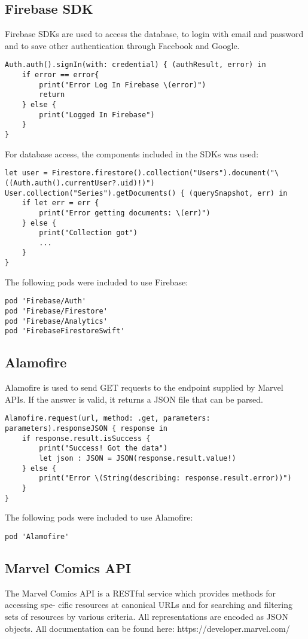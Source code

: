 \clearpage
    
    
\subsection{Firebase SDK}
Firebase SDKs are used to access the database, to login with email and password and to save other authentication through Facebook and Google.
\begin{lstlisting}
Auth.auth().signIn(with: credential) { (authResult, error) in
	if error == error{
		print("Error Log In Firebase \(error)")
		return
	} else {
		print("Logged In Firebase")
	}
}
\end{lstlisting}

For database access, the components included in the SDKs was used:
\begin{lstlisting}
let user = Firestore.firestore().collection("Users").document("\((Auth.auth().currentUser?.uid)!)")
User.collection("Series").getDocuments() { (querySnapshot, err) in
	if let err = err {
		print("Error getting documents: \(err)")
	} else {
		print("Collection got")
		...
	}
}
\end{lstlisting}

The following pods were included to use Firebase:
\begin{lstlisting}
pod 'Firebase/Auth'
pod 'Firebase/Firestore'
pod 'Firebase/Analytics'
pod 'FirebaseFirestoreSwift'
\end{lstlisting}


\clearpage

\subsection{Alamofire}
Alamofire is used to send GET requests to the endpoint supplied by Marvel APIs. If the answer is valid, it returns a JSON file that can be parsed.
\begin{lstlisting}
Alamofire.request(url, method: .get, parameters: parameters).responseJSON { response in
	if response.result.isSuccess {
		print("Success! Got the data")
		let json : JSON = JSON(response.result.value!)
	} else {
		print("Error \(String(describing: response.result.error))")
	}
}
\end{lstlisting}
The following pods were included to use Alamofire:
\begin{lstlisting}
pod 'Alamofire'
\end{lstlisting}

\clearpage

\subsection{Marvel Comics API}
The Marvel Comics API is a RESTful service which provides methods for accessing spe- cific resources at canonical URLs and for searching and filtering sets of resources by various criteria. All representations are encoded as JSON objects. All documentation can be found here: https://developer.marvel.com/

